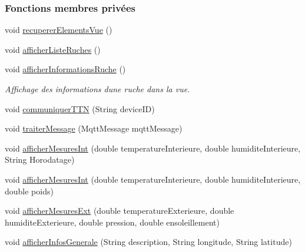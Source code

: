\subsubsection*{Fonctions membres privées}
\begin{DoxyCompactItemize}
\item 
void \hyperlink{classfr_1_1campus_1_1laurainc_1_1honeybee_1_1_dashboard_activity_a2ab46c5580913347e2dd18976be5900a}{recuperer\+Elements\+Vue} ()
\item 
void \hyperlink{classfr_1_1campus_1_1laurainc_1_1honeybee_1_1_dashboard_activity_aeb7cdaf69c379e2b070e290130199543}{afficher\+Liste\+Ruches} ()
\item 
void \hyperlink{classfr_1_1campus_1_1laurainc_1_1honeybee_1_1_dashboard_activity_a88f00531bee33bd6c47b33f5ac4df9ed}{afficher\+Informations\+Ruche} ()
\begin{DoxyCompactList}\small\item\em Affichage des informations d\textquotesingle{}une ruche dans la vue. \end{DoxyCompactList}\item 
void \hyperlink{classfr_1_1campus_1_1laurainc_1_1honeybee_1_1_dashboard_activity_abfefd572745e1034a025bc836812ae4f}{communiquer\+T\+TN} (String device\+ID)
\item 
void \hyperlink{classfr_1_1campus_1_1laurainc_1_1honeybee_1_1_dashboard_activity_a50d4c14e993ff1779ae5dce8cee11216}{traiter\+Message} (Mqtt\+Message mqtt\+Message)
\item 
void \hyperlink{classfr_1_1campus_1_1laurainc_1_1honeybee_1_1_dashboard_activity_aa177b8212619dec95e0a8eae4dbc867d}{afficher\+Mesures\+Int} (double temperature\+Interieure, double humidite\+Interieure, String Horodatage)
\item 
void \hyperlink{classfr_1_1campus_1_1laurainc_1_1honeybee_1_1_dashboard_activity_a4cc45d2f5c203313baaac3310d91e4be}{afficher\+Mesures\+Int} (double temperature\+Interieure, double humidite\+Interieure, double poids)
\item 
void \hyperlink{classfr_1_1campus_1_1laurainc_1_1honeybee_1_1_dashboard_activity_afffb9de4776b6c6cea676a08251a58ba}{afficher\+Mesures\+Ext} (double temperature\+Exterieure, double humidite\+Exterieure, double pression, double ensoleillement)
\item 
void \hyperlink{classfr_1_1campus_1_1laurainc_1_1honeybee_1_1_dashboard_activity_aaa61ed43c60c82f934647f15a38792cd}{afficher\+Infos\+Generale} (String description, String longitude, String latitude)
\item 

\end{DoxyCompactItemize}
